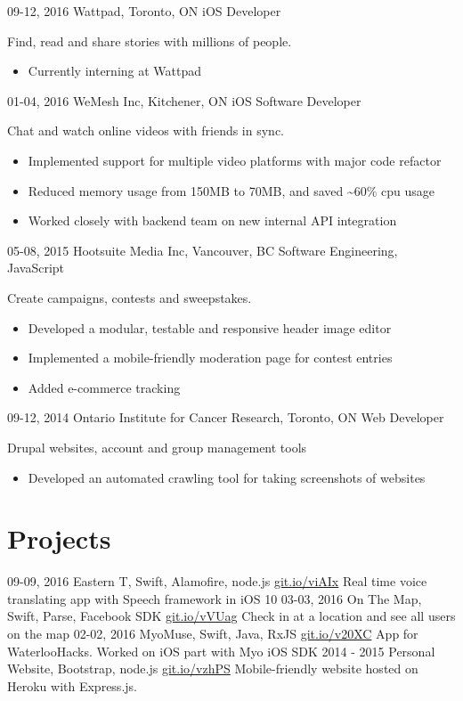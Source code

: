 \documentclass[]{friggeri-cv}
\begin{document}
\begin{entrylist}
    \entry
    {09-12, 2016}
    {Wattpad\normalfont, Toronto, ON}
    {iOS Developer}
    {Find, read and share stories with millions of people.
    \begin{itemize}
        \item Currently interning at Wattpad
    \end{itemize}
    }
  \entry
    {01-04, 2016}
    {WeMesh Inc\normalfont, Kitchener, ON}
    {iOS Software Developer}
    {Chat and watch online videos with friends in sync.
    \begin{itemize}
        \item Implemented support for multiple video platforms with major code refactor
        \item Reduced memory usage from 150MB to 70MB, and saved \textasciitilde60\% cpu usage
        \item Worked closely with backend team on new internal API integration
    \end{itemize}
    }
  \entry
    {05-08, 2015}
    {Hootsuite Media Inc\normalfont, Vancouver, BC}
    {Software Engineering, JavaScript}
    {Create campaigns, contests and sweepstakes.
    \begin{itemize}
        \item Developed a modular, testable and responsive header image editor
        \item Implemented a mobile-friendly moderation page for contest entries
        \item Added e-commerce tracking
    \end{itemize}
    }
  \entry
    {09-12, 2014}
    {Ontario Institute for Cancer Research\normalfont, Toronto, ON}
    {Web Developer}
    {Drupal websites, account and group management tools
    \begin{itemize}
        \item Developed an automated crawling tool for taking screenshots of websites
    \end{itemize}
    }
\end{entrylist}

\section{Projects}

\begin{entrylist}
  \entry
    {09-09, 2016}
    {Eastern T\normalfont, Swift, Alamofire, node.js}
    {\href{https://git.io/viAIx}{git.io/viAIx}}
    {Real time voice translating app with Speech framework in iOS 10}
  \entry
    {03-03, 2016}
    {On The Map\normalfont, Swift, Parse, Facebook SDK}
    {\href{https://git.io/vVUag}{git.io/vVUag}}
    {Check in at a location and see all users on the map}
  \entry
    {02-02, 2016}
    {MyoMuse\normalfont, Swift, Java, RxJS}
    {\href{https://git.io/v20XC}{git.io/v20XC}}
    {App for WaterlooHacks. Worked on iOS part with Myo iOS SDK}
  \entry
    {2014 - 2015}
    {Personal Website\normalfont, Bootstrap, node.js}
    {\href{https://git.io/vzhPS}{git.io/vzhPS}}
    {Mobile-friendly website hosted on Heroku with Express.js.}
\end{entrylist}
\end{document}
